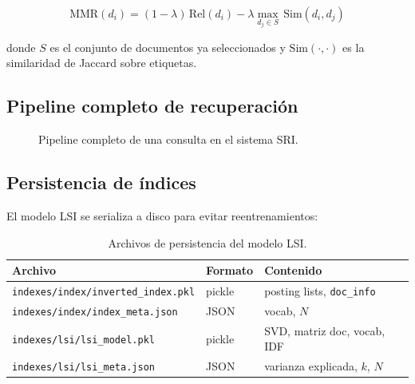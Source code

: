 \documentclass{llncs}
\begin{document}
\[
  \text{MMR}(d_i) = (1-\lambda)\,\text{Rel}(d_i)
                  - \lambda \max_{d_j \in S}\,\text{Sim}(d_i, d_j)
\]

donde $S$ es el conjunto de documentos ya seleccionados y
$\text{Sim}(\cdot,\cdot)$ es la similaridad de Jaccard sobre etiquetas.

\subsection{Pipeline completo de recuperación}

\begin{figure}[h]
\centering
{}
\caption{Pipeline completo de una consulta en el sistema SRI.}
\end{figure}

\subsection{Persistencia de índices}
\label{sec:persist}

El modelo LSI se serializa a disco para evitar reentrenamientos:

\begin{table}[h]
  \centering
  \caption{Archivos de persistencia del modelo LSI.}
  \begin{tabular}{lll}
    \toprule
    \textbf{Archivo} & \textbf{Formato} & \textbf{Contenido} \\
    \midrule
    \texttt{indexes/index/inverted\_index.pkl} & pickle & posting lists, \texttt{doc\_info} \\
    \texttt{indexes/index/index\_meta.json}    & JSON   & vocab, $N$ \\
    \texttt{indexes/lsi/lsi\_model.pkl}        & pickle & SVD, matriz doc, vocab, IDF \\
    \texttt{indexes/lsi/lsi\_meta.json}        & JSON   & varianza explicada, $k$, $N$ \\
    \bottomrule
  \end{tabular}
\end{table}
\end{document}
